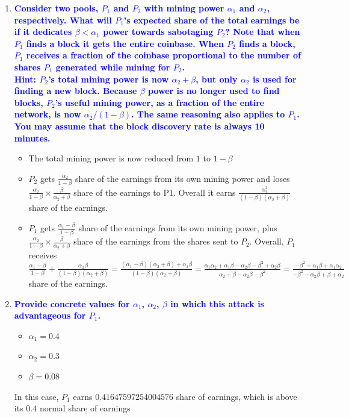 \documentclass[11pt]{article}
\begin{document}
\begin{enumerate}
    \begin{enumerate}
    \item \textbf{\textcolor{blue}{Consider two pools, $P_1$ and $P_2$ with mining power $\alpha_1$ and $\alpha_2$, respectively. What will $P_1$'s expected share of the total earnings be if it dedicates $\beta < \alpha_1$ power towards sabotaging $P_2$? Note that when $P_1$ finds a block it gets the entire coinbase. When $P_2$ finds a block, $P_1$ receives a fraction of the coinbase proportional to the number of shares $P_1$ generated while mining for $P_2$.
    \\ Hint: $P_2$'s total mining power is now $\alpha_2 + \beta$, but only $\alpha_2$ is used for finding a new block. Because $\beta$ power is no longer used to find blocks, $P_2$'s useful mining power, as a fraction of the entire network, is now $\alpha_2 / (1 - \beta)$. The same reasoning also applies to $P_1$. You may assume that the block discovery rate is always 10 minutes.}}
        \begin{itemize}
            \item The total mining power is now reduced from $1$ to $1 - \beta$
            \item $P_2$ gets $\frac{\alpha_2}{1 - \beta}$ share of the earnings from its own mining power and loses $\frac{\alpha_2}{1 - \beta} \times \frac{\beta}{\alpha_2 + \beta}$ share of the earnings to P1. Overall it earns $\frac{\alpha_2^2}{(1 - \beta)(\alpha_2 + \beta)}$  share of the earnings.
            \item $P_1$ gets $\frac{\alpha_1 - \beta}{1 - \beta}$ share of the earnings from its own mining power, plus $\frac{\alpha_2}{1 - \beta} \times \frac{\beta}{\alpha_2 + \beta}$  share of the earnings from the shares sent to $P_2$. Overall, $P_1$ receives $\frac{\alpha_1 - \beta}{1 - \beta} + \frac{\alpha_2 \beta}{(1 - \beta)(\alpha_2 + \beta)} = \frac{(\alpha_1 - \beta)(\alpha_2 + \beta) + \alpha_2 \beta}{(1 - \beta)(\alpha_2 + \beta)} = \frac{\alpha_1 \alpha_2 + \alpha_1 \beta - \alpha_2 \beta - \beta^2 + \alpha_2 \beta}{\alpha_2 + \beta - \alpha_2 \beta - \beta^2} = \frac{ - \beta^2  + \alpha_1 \beta + \alpha_1 \alpha_2}{- \beta^2 - \alpha_2 \beta + \beta + \alpha_2}$  share of the earnings.
        \end{itemize}
    
    \item \textbf{\textcolor{blue}{Provide concrete values for $\alpha_1$, $\alpha_2$, $\beta$ in which this attack is advantageous for $P_1$.}}
        \begin{itemize}
            \item $\alpha_1 = 0.4$
            \item $\alpha_2 = 0.3$
            \item $\beta = 0.08$
        \end{itemize}
        In this case, $P_1$ earns $0.41647597254004576$ share of earnings, which is above its $0.4$ normal share of earnings
        

\end{enumerate}
\end{enumerate}
\end{document}

